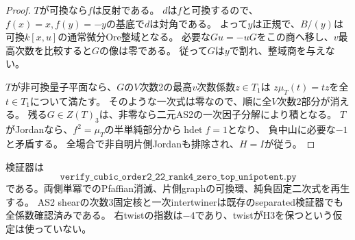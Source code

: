 \begin{proof}
$T$が可換なら$f$は反射である。
$d$は$f$と可換するので、$f(x)=x,f(y)=-y$の基底で$d$は対角である。
よって$y$は正規で、$B/(y)$は可換$k[x,u]$の通常微分Ore整域となる。
必要な$Gu=-uG$をこの商へ移し、$v$最高次数を比較すると$G$の像は零である。
従って$G$は$y$で割れ、整域商を与えない。

$T$が非可換量子平面なら、$G$の$V$次数2の最高$v$次数係数$z\in T_1$は
$z\mu_T(t)=tz$を全$t\in T_1$について満たす。
そのような一次式は零なので、順に全$V$次数2部分が消える。
残る$G\in Z(T)_3$は、非零なら二元AS2の一次因子分解により積となる。
$T$がJordanなら、$f^2=\mu_T$の半単純部分から$\operatorname{hdet}f=1$となり、
負中山に必要な$-1$と矛盾する。
全場合で非自明片側Jordanも排除され、$H=I$が従う。
\end{proof}

検証器は
\[
 \texttt{verify\_cubic\_order2\_22\_rank4\_zero\_top\_unipotent.py}
\]
である。両側単冪でのPfaffian消滅、片側graphの可換環、純負固定二次式を再生する。
AS2 shearの次数3固定核と一次intertwinerは既存のseparated検証器でも全係数確認済みである。
右twistの指数は$-4$であり、twistがH3を保つという仮定は使っていない。
